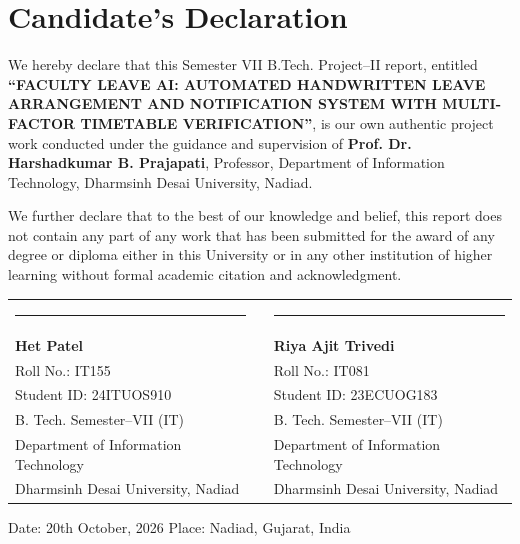 \documentclass[12pt,letterpaper]{report}
\begin{document}
\newpage
\chapter*{Candidate’s Declaration}

We hereby declare that this Semester VII B.Tech. Project--II report, entitled \textbf{“FACULTY LEAVE AI: AUTOMATED HANDWRITTEN LEAVE ARRANGEMENT AND NOTIFICATION SYSTEM WITH MULTI-FACTOR TIMETABLE VERIFICATION”}, is our own authentic project work conducted under the guidance and supervision of \textbf{Prof. Dr. Harshadkumar B. Prajapati}, Professor, Department of Information Technology, Dharmsinh Desai University, Nadiad.

We further declare that to the best of our knowledge and belief, this report does not contain any part of any work that has been submitted for the award of any degree or diploma either in this University or in any other institution of higher learning without formal academic citation and acknowledgment.

\vspace{2.5cm}

\noindent
\begin{tabularx}{\textwidth}{XrX}
\rule{6.5cm}{0.4pt} & & \rule{6.5cm}{0.4pt} \\
\textbf{Het Patel} & & \textbf{Riya Ajit Trivedi} \\
Roll No.: IT155 & & Roll No.: IT081 \\
Student ID: 24ITUOS910 & & Student ID: 23ECUOG183 \\
B. Tech. Semester--VII (IT) & & B. Tech. Semester--VII (IT) \\
Department of Information Technology & & Department of Information Technology \\
Dharmsinh Desai University, Nadiad & & Dharmsinh Desai University, Nadiad \\
\end{tabularx}

\vspace{1.5cm}
\noindent Date: 20th October, 2026 \hfill Place: Nadiad, Gujarat, India

\newpage
\end{document}
